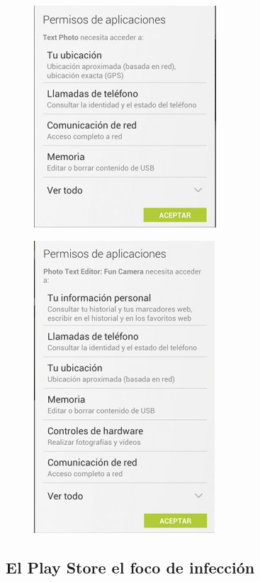 \documentclass[12pt]{beamer} %
\begin{document}
\begin{slide}
    \begin{figure}[h]
      \includegraphics[height=0.9\textheight]{img/permisos1.png}
    \end{figure}
\end{slide}

\begin{slide}
    \begin{figure}[h]
      \includegraphics[height=0.9\textheight]{img/permisos2.png}
    \end{figure}
\end{slide}

\subsection{El Play Store el foco de infección}
\end{document}
